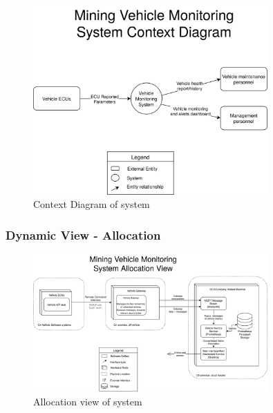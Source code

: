 \begin{figure}[H]
\centering
\includegraphics[width=0.8\textwidth]{Images/project-context-diagram.png}
\caption{Context Diagram of system}
\label{fig:system_context_diagram}
\end{figure}

\subsubsection{Dynamic View - Allocation}

\begin{figure}[H]
\centering
\includegraphics[width=0.8\textwidth]{Images/project-allocation-view.png}
\caption{Allocation view of system}
\label{fig:allocation_view}
\end{figure}

